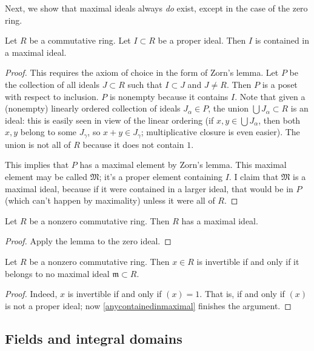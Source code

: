 Next, we show that maximal ideals always \emph{do} exist, except in the case
of the zero ring. 
\begin{proposition} \label{anycontainedinmaximal}
Let $R$ be a commutative ring. Let $I \subset R$ be a proper ideal.  Then $I$
is contained in a maximal ideal.
\end{proposition} 

\begin{proof} 
This requires the axiom of choice in the form of Zorn's lemma.  Let
$P$ be the collection of all ideals $J \subset R$ such that $I
\subset J$ and $J \neq R$.  Then $P$ is a poset with respect to  inclusion.  $P$ is
nonempty because it contains $I$.  Note that given a (nonempty) linearly ordered
collection of ideals $J_{\alpha} \in P$, the union $\bigcup J_{\alpha} \subset
R$ is an ideal: this is easily seen in view of the linear ordering (if $x,y
\in \bigcup J_{\alpha}$, then both $x,y$ belong to some $J_{\gamma}$, so $x+y
\in J_{\gamma}$; multiplicative closure is even easier). The union is not all
of $R$ because it does not contain $1$.  

This implies that $P$ has a maximal element by Zorn's lemma.  This maximal element may
be called $\mathfrak{M}$; it's a proper element containing $I$. I claim that
$\mathfrak{M}$ is a maximal ideal, because if it were contained in a larger
 ideal, that would  be in $P$ (which can't happen by maximality) unless it were all of $R$.
\end{proof} 

\begin{corollary} 
Let $R $ be a nonzero commutative ring.  Then $R$ has a maximal ideal.
\end{corollary} 
\begin{proof} 
Apply the lemma to the zero ideal.  
\end{proof} 

\begin{corollary} 
Let $R$ be a nonzero commutative ring. Then $x \in R$ is invertible if and
only if it belongs to no maximal ideal $\mathfrak{m} \subset R$.
\end{corollary} 
\begin{proof} 
Indeed, $x$ is invertible if and only if $(x) = 1$. That is, if and only if
$(x)$ is not a proper ideal; now \cref{anycontainedinmaximal}
finishes the argument.
\end{proof} 

\subsection{Fields and integral domains}

